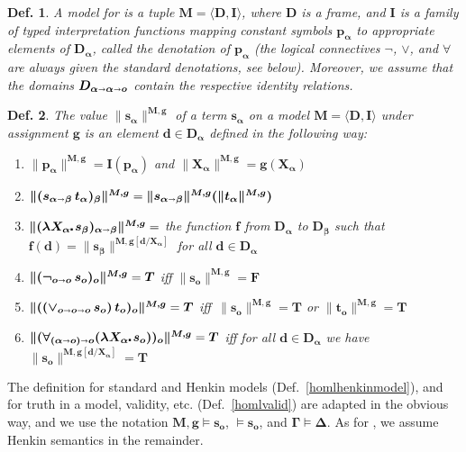 \documentclass{ecai2014}
\newtheorem{definition}{Def.}
\def\lambdot{\rule{0.6mm}{0.6mm}\hspace{0.4ex}}
\def\lam#1{\lambda #1\lambdot}
\newcommand\entity[1]{\text{\textrm{#1}}}
\def\HOML{\entity{HOML}\xspace}
\def\HOL{\entity{HOL}\xspace}
\def\ar{\shortrightarrow}
\newcommand\hol[1]{\boldsymbol{#1}}
\begin{document}
\begin{definition}\label{holmodel}
  A \emph{model} for \HOL is a tuple $\hol{M}=\hol{\langle D, I \rangle}$, where
  $\hol{D}$ is a frame, and $\hol{I}$ is a family of typed interpretation
  functions mapping constant symbols $\hol{p_\alpha}$ to appropriate
  elements of $\hol{D_\alpha}$, called the \emph{denotation of $\hol{p_\alpha}$}
  (the logical connectives $\hol{\neg}$, $\hol{\vee}$, and $\hol{\forall}$ are always
  given the standard denotations, see below).  Moreover, we assume that the domains
  $\hol{D_{\alpha\ar\alpha\ar o}}$ contain the respective identity relations.
\end{definition}


\begin{definition}\label{holvalue}
  The \emph{value} $\hol{\| s_\alpha\|^{M,g}}$ of a \HOL term
  $\hol{s_\alpha}$ on a model $\hol{M}=\hol{\langle D, I \rangle}$ under assignment $\hol{g}$ is an element $\hol{d}\in \hol{D_\alpha}$
  defined in the following way:
\begin{enumerate}
\item $\hol{\|p_\alpha\|^{M,g}} = \hol{I(p_\alpha)}$ and $\hol{\|X_\alpha\|^{M,g}} = \hol{g(X_\alpha)}$
\item $\hol{\|(s_{\alpha\ar\beta}\, t_\alpha)_\beta\|^{M,g}} = \hol{\|s_{\alpha\ar\beta}\|^{M,g}(\|t_\alpha\|^{M,g})}$
\item $\hol{\|(\lam{X_\alpha}s_\beta)_{\alpha\ar\beta}\|^{M,g}} = $
  the function $\hol{f}$ from $\hol{D_\alpha}$ to $\hol{D_\beta}$ such
  that $\hol{f(d)} = \hol{\|s_\beta\|^{M,g[d/X_\alpha]}}$ for all
  $\hol{d}\in \hol{D_\alpha}$
\item $\hol{\|(\neg_{o\ar o}\, s_o)_o\|^{M,g}} = \hol{T}$ iff $\hol{\|s_o\|^{M,g}} = \hol{F}$
\item $\hol{\|(({\vee_{o\ar o\ar o}}\,s_o)\,t_o)_o\|^{M,g}} =
  \hol{T}$ iff\, $\hol{\|s_o\|^{M,g}} = \hol{T}$ or $\hol{\|t_o\|^{M,g}}
  = \hol{T}$
\item $\hol{\|(\forall_{(\alpha\ar o)\ar o}(\lam{X_\alpha}
    s_o))_o\|^{M,g}} = \hol{T}$ iff for all $\hol{d}\in
  \hol{D_\alpha}$ we have $\hol{\|s_o\|^{M,g[d/X_\alpha]}} = \hol{T}$
\end{enumerate}
\end{definition}


The definition for standard and Henkin models
(Def.~\ref{homlhenkinmodel}), and for truth in a model, validity,
etc. (Def.~\ref{homlvalid}) are adapted in the obvious way, and we use
the notation $\hol{M,g \models s_o}$, $\hol{\models s_o}$, and
$\hol{\Gamma \models \Delta}$. As for \HOML, we assume Henkin
semantics in the remainder.
\end{document}
